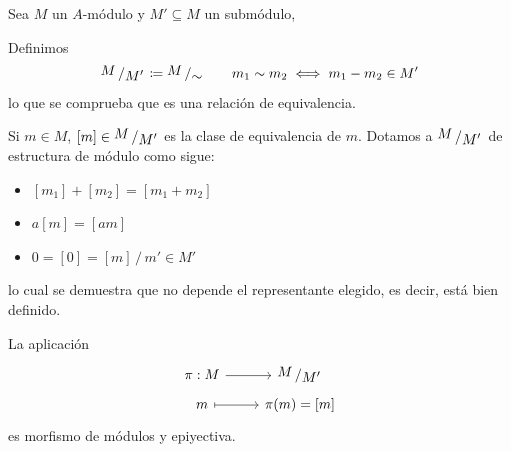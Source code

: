 Sea $M$ un $A$-m\'odulo y $M' \subseteq M$ un subm\'odulo,
\begin{defi}
Definimos 
$$\modulo{M}{M'} \coloneq \modulo{M}{\sim} \qquad m_1\sim m_2 \iff m_1 - m_2 \in M'$$
lo que se comprueba que es una relaci\'on de equivalencia. 

Si $m\in M$, $[m]\in \modulo{M}{M'}$ es la clase de equivalencia de $m$. Dotamos a $\modulo{M}{M'}$ de estructura de m\'odulo como sigue:
\begin{itemize}
    \item $[m_1]+[m_2] = [m_1 +m_2]$
    \item $a[m] = [am]$
    \item $0 = [0] =[m] \, / \, m'\in M'$
\end{itemize}
lo cual se demuestra que no depende el representante elegido, es decir, est\'a bien definido.
\end{defi}
\begin{prop}
    La aplicaci\'on
    $$\bt
    \pi : M \arrow{r} & \modulo{M}{M'} \\ [-5mm]
    m \arrow[mapsto]{r} & \pi(m) = [m]
    \et$$    
    es morfismo de m\'odulos y epiyectiva.
\end{prop}
